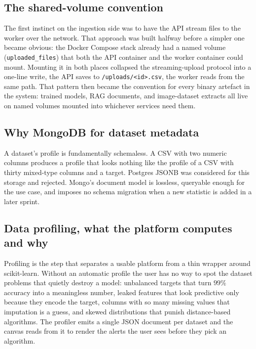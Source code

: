 \documentclass[12pt, a4paper, oneside]{report}
\begin{document}
\subsection{The shared-volume convention}

The first instinct on the ingestion side was to have the API stream
files to the worker over the network. That approach was built halfway
before a simpler one became obvious: the Docker Compose stack already
had a named volume (\texttt{uploaded\_files}) that both the API
container and the worker container could mount. Mounting it in both
places collapsed the streaming-upload protocol into a one-line write, the API saves to \texttt{/uploads/<id>.csv}, the worker reads
from the same path. That pattern then became the convention for
every binary artefact in the system: trained models, RAG documents,
and image-dataset extracts all live on named volumes mounted into
whichever services need them.

\subsection{Why MongoDB for dataset metadata}

A dataset's profile is fundamentally schemaless. A CSV with two
numeric columns produces a profile that looks nothing like the
profile of a CSV with thirty mixed-type columns and a target.
Postgres JSONB was considered for this storage and rejected. Mongo's
document model is lossless, queryable enough for the use case, and
imposes no schema migration when a new statistic is added in a later
sprint.

\subsection{Data profiling, what the platform computes and why}

Profiling is the step that separates a usable platform from a thin
wrapper around scikit-learn. Without an automatic profile the user
has no way to spot the dataset problems that quietly destroy a model:
unbalanced targets that turn $99\%$ accuracy into a meaningless
number, leaked features that look predictive only because they
encode the target, columns with so many missing values that
imputation is a guess, and skewed distributions that punish
distance-based algorithms. The profiler emits a single JSON
document per dataset and the canvas reads from it to render the
alerts the user sees before they pick an algorithm.
\end{document}
